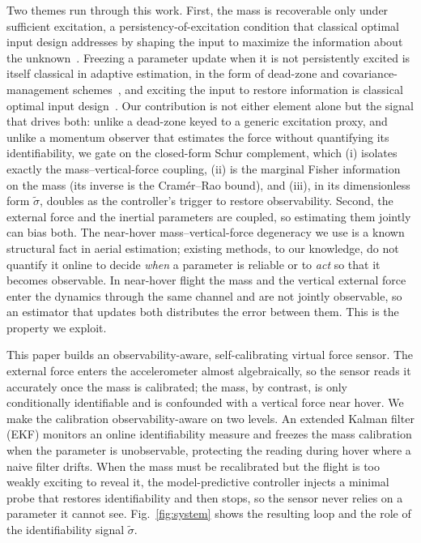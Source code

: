 \documentclass{ieeeaccess}
\begin{document}
Two themes run through this work. First, the mass is recoverable only under
sufficient excitation, a persistency-of-excitation condition that classical
optimal input design addresses by shaping the input to maximize the information
about the unknown~\cite{mehra1974optimal}. Freezing a parameter update when it is
not persistently excited is itself classical in adaptive estimation, in the form
of dead-zone and covariance-management schemes~\cite{smeur2016adaptive}, and
exciting the input to restore information is classical optimal input
design~\cite{mehra1974optimal}. Our contribution is not either element alone
but the signal that drives both: unlike a dead-zone keyed to a generic
excitation proxy, and unlike a momentum observer that estimates the force without
quantifying its identifiability, we gate on the closed-form Schur complement, which
(i) isolates exactly the mass--vertical-force coupling, (ii) is the marginal Fisher
information on the mass (its inverse is the Cram\'er--Rao bound), and (iii), in its
dimensionless form $\tilde\sigma$, doubles as the
controller's trigger to restore observability.
Second, the external force and the inertial parameters are coupled, so estimating
them jointly can bias both. The near-hover mass--vertical-force degeneracy we use
is a known structural fact in aerial estimation; existing methods, to our
knowledge, do not quantify it online to decide \emph{when} a parameter is
reliable or to \emph{act} so that it becomes observable. In near-hover flight
the mass and the vertical external force enter the dynamics through the same
channel and are not jointly observable, so an estimator that updates both
distributes the error between them. This is the property we exploit.

This paper builds an observability-aware, self-calibrating virtual force sensor.
The external force enters the accelerometer almost algebraically, so the sensor
reads it accurately once the mass is calibrated; the mass, by contrast, is only
conditionally identifiable and is confounded with a vertical force near hover. We
make the calibration observability-aware on two levels. An extended Kalman filter
(EKF) monitors an online identifiability measure and freezes the mass calibration
when the parameter is unobservable, protecting the reading during hover where a
naive filter drifts. When the mass must be recalibrated but the flight is too
weakly exciting to reveal it, the model-predictive controller injects a minimal probe that
restores identifiability and then stops, so the sensor never relies on a parameter
it cannot see. Fig.~\ref{fig:system} shows the resulting loop and the role of the
identifiability signal $\tilde\sigma$.
\end{document}
